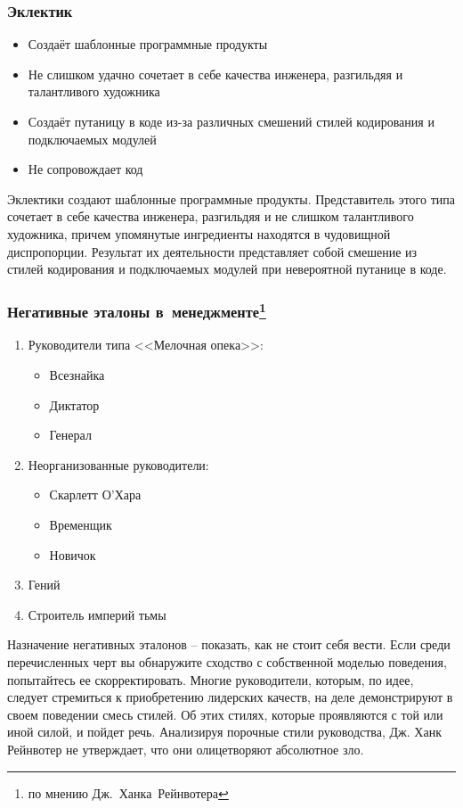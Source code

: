 \documentclass{../industrial-development}
\begin{document}
\begin{frame} \frametitle{Эклектик}
	\begin{itemize}
		\item Создаёт шаблонные программные продукты
		\item Не слишком удачно сочетает в себе качества инженера, разгильдяя и  талантливого художника 
		\item Создаёт путаницу в коде из-за различных смешений стилей кодирования и подключаемых модулей
		\item Не сопровождает код
	\end{itemize}
\end{frame}
\lecturenotes
Эклектики создают шаблонные программные продукты. Представитель этого типа сочетает в себе качества инженера, разгильдяя и не слишком талантливого художника, причем упомянутые ингредиенты находятся в чудовищной диспропорции. Результат их деятельности представляет собой смешение из стилей кодирования и подключаемых модулей при невероятной путанице в коде. 

\begin{frame} \frametitle{Негативные эталоны в~менеджменте\footnote[1]{по мнению Дж.~Ханка~Рейнвотера}}
	\begin{enumerate}
\item Руководители типа <<Мелочная опека>>:
		 \begin{itemize}
                     \item Всезнайка
 		 \item Диктатор
 		 \item Генерал
		\end{itemize} 
\item Неорганизованные руководители:	
		 \begin{itemize}
                     \item Скарлетт О'Хара
		 \item Временщик
 		\item Новичок
		\end{itemize} 
\item Гений
\item Строитель империй тьмы
\end{enumerate}
\end{frame}
\lecturenotes
Назначение негативных эталонов – показать, как не стоит себя вести. Если среди
перечисленных черт вы обнаружите сходство с собственной моделью поведения,
попытайтесь ее скорректировать. 
Многие руководители, которым, по идее, следует стремиться к приобретению лидерских качеств, на деле демонстрируют в своем поведении смесь стилей. Об этих стилях, которые проявляются с той или иной силой, и пойдет речь. Анализируя порочные стили руководства, Дж. Ханк Рейнвотер не утверждает, что они олицетворяют абсолютное зло. 
\end{document}
